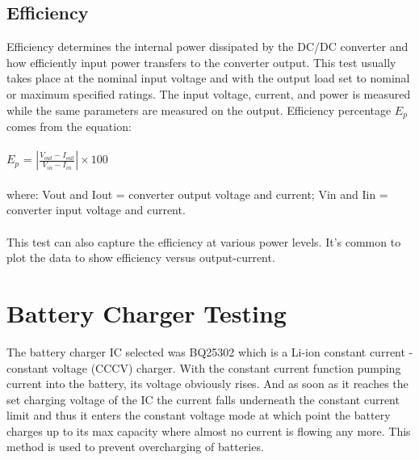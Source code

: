 \subsection{Efficiency} 

Efficiency determines the internal power dissipated by the DC/DC converter and how efficiently input power transfers to the converter output. This test usually takes place at the nominal input voltage and with the output load set to nominal or maximum specified ratings. The input voltage, current, and power is measured while the same parameters are measured on the output. Efficiency percentage $E_{p}$ comes from the equation:
\\ \\
\hspace*{5cm}$E_{p}$ = $\left | \frac{V_{out}-I_{out}}{V_{in}-I_{in}} \right | \times 100$
\\ \\
where:
Vout and Iout = converter output voltage and current;
Vin and Iin = converter input voltage and current.
\\ \\
This test can also capture the efficiency at various power levels. It’s common to plot the data to show efficiency versus output-current.

\section{Battery Charger Testing}
 The battery charger IC selected was BQ25302 which is a Li-ion constant current - constant voltage (CCCV) charger. With the constant current function pumping current into the battery, its voltage obviously rises. And as soon as it reaches the set charging voltage of the IC the current
falls underneath the constant current limit and thus it enters the constant voltage mode at which point the battery charges up to its max capacity where almost no current is flowing any more. This method is used to prevent overcharging of batteries.

